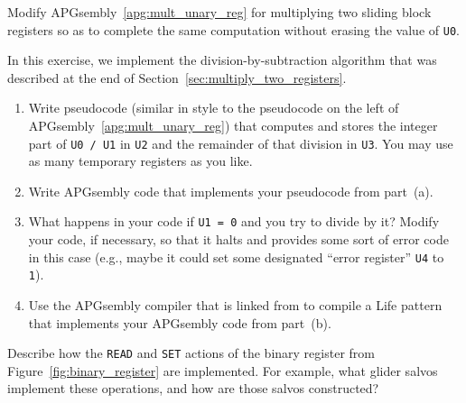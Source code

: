 \begin{multicols}{2}
	
	\mfilbreak
	
	
	\begin{problem}\label{exer:universal_computation_mult_preserve_r0} 
		Modify APGsembly~\ref{apg:mult_unary_reg} for multiplying two sliding block registers so as to complete the same computation without erasing the value of \texttt{U0}.
		
	\end{problem}
	
	
	\mfilbreak
	
	
	\begin{problem}\label{exer:division_by_subtraction} 
		In this exercise, we implement the division-by-subtraction algorithm that was described at the end of Section~\ref{sec:multiply_two_registers}.\smallskip
		
		\begin{enumerate}[label=\bf\color{ocre}(\alph*)]
			\item Write pseudocode (similar in style to the pseudocode on the left of APGsembly~\ref{apg:mult_unary_reg}) that computes and stores the integer part of \texttt{U0 / U1} in \texttt{U2} and the remainder of that division in \texttt{U3}. You may use as many temporary registers as you like.
			
			\item Write APGsembly code that implements your pseudocode from part~(a).
			
			\item What happens in your code if \texttt{U1 = 0} and you try to divide by it? Modify your code, if necessary, so that it halts and provides some sort of error code in this case (e.g., maybe it could set some designated ``error register'' \texttt{U4} to \texttt{1}).
			
			\item Use the APGsembly compiler that is linked from  to compile a Life pattern that implements your APGsembly code from part~(b).
		\end{enumerate}
	\end{problem}


	\mfilbreak
	
	
	\begin{problem}\label{exer:describe_binary_register} 
		Describe how the \texttt{READ} and \texttt{SET} actions of the binary register from Figure~\ref{fig:binary_register} are implemented. For example, what glider salvos implement these operations, and how are those salvos constructed?
	\end{problem}
	

\end{multicols}
